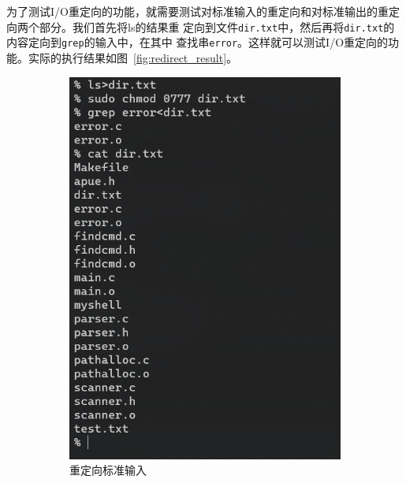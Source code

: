\documentclass[a4paper,twoside]{article}
\begin{document}
\begin{spacing}{1.2}
为了测试I/O重定向的功能，就需要测试对标准输入的重定向和对标准输出的重定向两个部分。我们首先将ls的结果重
定向到文件\texttt{dir.txt}中，然后再将\texttt{dir.txt}的内容定向到\texttt{grep}的输入中，在其中
查找串\texttt{error}。这样就可以测试I/O重定向的功能。实际的执行结果如图~\ref{fig:redirect_result}。
\begin{figure}[htb]
	\centering
	\caption{I/O重定向结果}
	\label{fig:redirect_result}
	\begin{subfigure}{0.4\textwidth}
		\centering
		\includegraphics[width=\textwidth]{stdin.png}
		\caption{重定向标准输入}
		\label{fig:f2}
	\end{subfigure}
	\begin{subfigure}{0.4\textwidth}
		\centering

\end{subfigure}
\end{figure}
\end{spacing}
\end{document}
